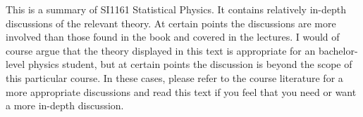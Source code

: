 This is a summary of SI1161 Statistical Physics. It contains relatively in-depth discussions of the relevant theory. At certain points the discussions are more involved than those found in the book and covered in the lectures. I would of course argue that the theory displayed in this text is appropriate for an bachelor-level physics student, but at certain points the discussion is beyond the scope of this particular course. In these cases, please refer to the course literature for a more appropriate discussions and read this text if you feel that you need or want a more in-depth discussion.